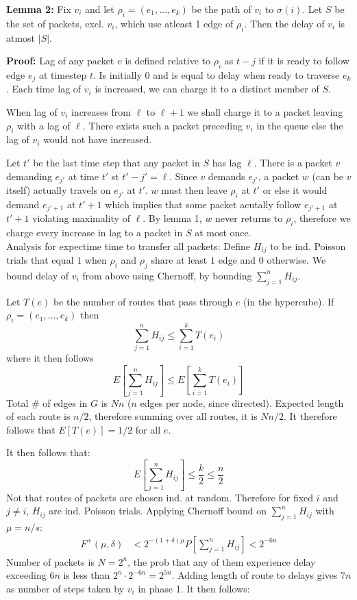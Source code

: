 \documentclass[a4paper]{article}
\begin{document}
\textbf{Lemma 2:} Fix $v_i$ and let $\rho_i=(e_1,\ldots,e_k)$ be the path of $v_i$ to $\sigma(i)$. Let $S$ be the set of packets, excl. $v_i$, which use atleast 1 edge of $\rho_i$. Then the delay of $v_i$ is atmost $|S|$.

\textbf{Proof:} Lag of any packet $v$ is defined relative to $\rho_i$ as $t-j$ if it is ready to follow edge $e_j$ at timestep $t$. Is initially $0$ and is equal to delay when ready to traverse $e_k$. Each time lag of $v_i$ is increased, we can charge it to a distinct member of $S$.

When lag of $v_i$ increases from $\ell$ to $\ell + 1$ we shall charge it to a packet leaving $\rho_i$ with a lag of $\ell$. There exists such a packet preceding $v_i$ in the queue else the lag of $v_i$ would not have increased.

Let $t'$ be the last time step that any packet in $S$ has lag $\ell$. There is a packet $v$ demanding $e_{j'}$ at time $t'$ st $t'-j'=\ell$. Since $v$ demands $e_{j'}$, a packet $w$ (can be $v$ itself) actually travels on $e_{j'}$ at $t'$. $w$ must then leave $\rho_i$ at $t'$ or else it would demand $e_{j'+1}$ at $t'+1$ which implies that some packet acutally follow $e_{j'+1}$ at $t'+1$ violating maximality of $\ell$. By lemma 1, $w$ never returns to $\rho_i$, therefore we charge
every increase in lag to a packet in $S$ at most once.\\

Analysis for expectime time to transfer all packets: Define $H_{ij}$ to be ind. Poisson trials that equal $1$ when $\rho_i$ and $\rho_j$ share at least $1$ edge and $0$ otherwise. We bound delay of $v_i$ from above using Chernoff, by bounding $\sum^{n}_{j=1} H_{ij}$.

Let $T(e)$ be the number of routes that pass through $e$ (in the hypercube). If $\rho_i=(e_1,\ldots,e_k)$ then
$$
\sum^{n}_{j=1} H_{ij}\leq \sum^{k}_{i=1} T(e_i)
$$
where it then follows
$$
E\left[\sum^{n}_{j=1} H_{ij} \right]\leq E\left[\sum^{k}_{i=1} T(e_i)\right]
$$
Total $\#$ of edges in $G$ is $Nn$ ($n$ edges per node, since directed). Expected length of each route is $n/2$, therefore summing over all routes, it is $Nn/2$. It therefore follows that $E[T(e)]=1/2$ for all $e$.

It then follows that:
$$
E\left[\sum^{n}_{j=1} H_{ij}\right] \leq \frac{k}{2} \leq \frac{n}{2}
$$
Not that routes of packets are chosen ind. at random. Therefore for fixed $i$ and $j\not=i$, $H_{ij}$ are ind. Poisson trials. Applying Chernoff bound on $\sum^{n}_{j=1} H_{ij}$ with $\mu=n/s$:
\begin{align*}
  F^+(\mu,\delta) &< 2^{-(1+\delta)\mu}
  P\left[\sum^{n}_{j=1} H_{ij} \right]< 2^{-6n}
\end{align*}
Number of packets is $N=2^n$, the prob that any of them experience delay exceeding $6n$ is less than $2^n\cdot 2^{-6n}=2^{5n}$. Adding length of route to delays gives $7n$ as number of steps taken by $v_i$ in phase 1. It then follows:\\
\end{document}
